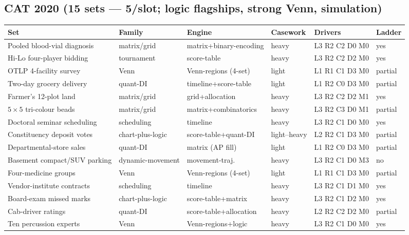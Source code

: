 \documentclass[11pt,a4paper]{article}
\newcommand{\invtab}{\footnotesize}
\begin{document}
\subsection{CAT 2020 (15 sets --- 5/slot; logic flagships, strong Venn, simulation)}
{\invtab
\begin{longtable}{p{3.0cm}p{2.05cm}p{2.5cm}p{1.2cm}p{2.05cm}p{1.7cm}}
\toprule
\textbf{Set} & \textbf{Family} & \textbf{Engine} & \textbf{Casework} & \textbf{Drivers} & \textbf{Ladder} \\
\midrule
\endhead
Pooled blood-vial diagnosis & matrix/grid & matrix+binary-encoding & heavy & L3 R2 C2 D0 M0 & yes \\
Hi-Lo four-player bidding & tournament & score-table & heavy & L3 R2 C2 D2 M0 & yes \\
OTLP 4-facility survey & Venn & Venn-regions (4-set) & light & L1 R1 C1 D3 M0 & partial \\
Two-day grocery delivery & quant-DI & timeline+score-table & light & L1 R2 C0 D3 M0 & partial \\
Farmer's 12-plot land & matrix/grid & grid+allocation & heavy & L3 R2 C2 D2 M1 & yes \\
$5\times5$ tri-colour beads & matrix/grid & matrix+combinatorics & heavy & L3 R2 C3 D0 M1 & partial \\
Doctoral seminar scheduling & scheduling & timeline & heavy & L3 R2 C1 D0 M0 & yes \\
Constituency deposit votes & chart-plus-logic & score-table+quant-DI & light--heavy & L2 R2 C1 D3 M0 & partial \\
Departmental-store sales & quant-DI & matrix (AP fill) & light & L1 R2 C0 D3 M0 & partial \\
Basement compact/SUV parking & dynamic-movement & movement-traj. & heavy & L3 R2 C1 D0 M3 & no \\
Four-medicine groups & Venn & Venn-regions (4-set) & light & L1 R1 C1 D3 M0 & partial \\
Vendor-institute contracts & scheduling & timeline & heavy & L3 R2 C1 D1 M0 & yes \\
Board-exam missed marks & chart-plus-logic & score-table+matrix & heavy & L3 R2 C1 D2 M0 & yes \\
Cab-driver ratings & quant-DI & score-table+allocation & heavy & L2 R2 C2 D2 M0 & partial \\
Ten percussion experts & Venn & Venn-regions+logic & heavy & L3 R2 C1 D0 M0 & yes \\
\bottomrule
\end{longtable}}
\end{document}
